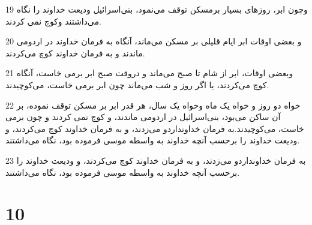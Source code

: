 \par 19 وچون ابر، روزهای بسیار برمسکن توقف می‌نمود، بنی‌اسرائیل ودیعت خداوند را نگاه می‌داشتند وکوچ نمی کردند.
\par 20 و بعضی اوقات ابر ایام قلیلی بر مسکن می‌ماند، آنگاه به فرمان خداوند در اردومی ماندند و به فرمان خداوند کوچ می‌کردند.
\par 21 وبعضی اوقات، ابر از شام تا صبح می‌ماند و دروقت صبح ابر برمی خاست، آنگاه کوچ می‌کردند، یا اگر روز و شب می‌ماند چون ابر برمی خاست، می‌کوچیدند.
\par 22 خواه دو روز و خواه یک ماه وخواه یک سال، هر قدر ابر بر مسکن توقف نموده، بر آن ساکن می‌بود، بنی‌اسرائیل در اردومی ماندند، و کوچ نمی کردند و چون برمی خاست، می‌کوچیدند.به فرمان خداونداردو می‌زدند، و به فرمان خداوند کوچ می‌کردند، و ودیعت خداوند را برحسب آنچه خداوند به واسطه موسی فرموده بود، نگاه می‌داشتند.
\par 23 به فرمان خداونداردو می‌زدند، و به فرمان خداوند کوچ می‌کردند، و ودیعت خداوند را برحسب آنچه خداوند به واسطه موسی فرموده بود، نگاه می‌داشتند.
 
\chapter{10}

